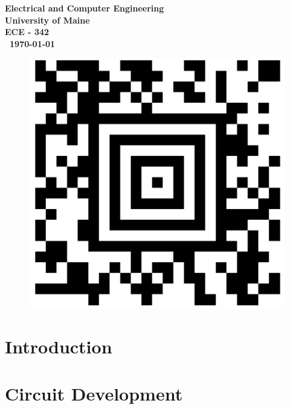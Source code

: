 \documentclass{article}
\begin{document}
\begin{titlepage}
\begin{center}
\begin{abstract}
        

        \end{abstract}
        
        
        \vspace{02.5cm}
        \textbf{
        Electrical and Computer Engineering\\
        University of Maine\\
        ECE - 342\\\ \today}
    \vspace{.5cm}
        \begin{figure}[H]
        \centering
        \includegraphics[scale = 0.1]{Images/barcode.png}
\end{figure}
    \end{center}
\end{titlepage}


\tableofcontents

\newpage

\newpage
\listoffigures
\listoftables
\newpage 
\clearpage




\section{Introduction}

  
 
  \section{Circuit Development}
    
  
\end{document}
